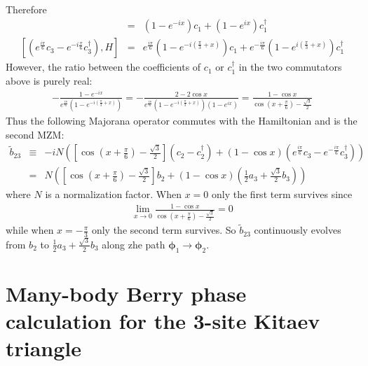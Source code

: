 \documentclass[aps,prb,showpacs,amsmath,amssymb,superscriptaddress]{revtex4-2}
\begin{document}
Therefore
\begin{eqnarray}
	[c_2 - c_2^\dag, H] &=& (1-e^{-ix})c_1 + (1-e^{ix})c_1^\dag\\\nonumber
	[\left( e^{\frac{i\pi}{6}} c_3 - e^{-i\frac{\pi}{6}} c_3^\dag \right), H] & = &  e^{\frac{i\pi}{6}} (1-e^{-i\left(\frac{\pi}{3} + x\right)})c_1 + e^{-\frac{i\pi}{6}}( 1- e^{i\left(\frac{\pi}{3} + x\right)})c_1^\dag
\end{eqnarray}
However, the ratio between the coefficients of $c_1$ or $c_1^\dag$ in the two commutators above is purely real:
\begin{eqnarray}
-\frac{1-e^{-ix}}{e^{\frac{i\pi}{6}} (1-e^{-i\left(\frac{\pi}{3} + x\right)})} = - \frac{2-2\cos x}{e^{\frac{i\pi}{6}} (1-e^{-i\left(\frac{\pi}{3} + x\right)})(1-e^{ix})} = \frac{1-\cos x}{\cos\left( x+ \frac{\pi}{6}\right)-\frac{\sqrt{3}}{2}}
\end{eqnarray}
Thus the following Majorana operator commutes with the Hamiltonian and is the second MZM:
\begin{eqnarray}
	\tilde{b}_{23} &\equiv& -iN\left(\left[\cos\left( x+ \frac{\pi}{6}\right)-\frac{\sqrt{3}}{2}\right](c_2 - c_2^\dag) + (1-\cos x) \left( e^{\frac{i\pi}{6}} c_3 -e^{-\frac{i\pi}{6}} c_3^\dag\right)\right)\\\nonumber
	&=& N\left(\left[\cos\left( x+ \frac{\pi}{6}\right)-\frac{\sqrt{3}}{2}\right]b_2 + (1-\cos x)\left( \frac{1}{2} a_3 + \frac{\sqrt{3}}{2} b_3\right)\right)
\end{eqnarray}
where $N$ is a normalization factor. When $x=0$ only the first term survives since
\begin{eqnarray}
\lim_{x\rightarrow 0} \frac{1-\cos x}{\cos\left( x+ \frac{\pi}{6}\right)-\frac{\sqrt{3}}{2}} = 0
\end{eqnarray}
while when $x = -\frac{\pi}{3}$ only the second term survives. So $\tilde{b}_{23}$ continuously evolves from $b_2$ to $\frac{1}{2} a_3 + \frac{\sqrt{3}}{2} b_3$ along zhe path $\boldsymbol{\phi}_1\rightarrow \boldsymbol{\phi}_2$.

\section{Many-body Berry phase calculation for the 3-site Kitaev triangle}
\end{document}

